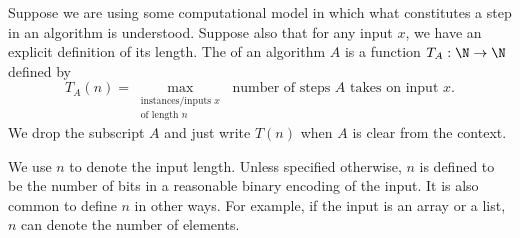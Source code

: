 \begin{definition}
\label{definition:Worst-case-running-time-of-an-algorithm}
Suppose we are using some computational model in which what constitutes a step in an algorithm is understood. Suppose also that for any input $x$, we have an explicit definition of its length. The  of an algorithm $A$ is a function $T_A : \N \to \N$ defined by
\[
T_A(n) = \max_{\substack{\text{instances/inputs $x$} \\ \text{of length $n$}}} \text{ number of steps $A$ takes on input $x$}.
\]
We drop the subscript $A$ and just write $T(n)$ when $A$ is clear from the context.

\end{definition}

\begin{important}
\label{important:Input-length}
We use $n$ to denote the input length. Unless specified otherwise, $n$ is defined to be the number of bits in a reasonable binary encoding of the input. It is also common to define $n$ in other ways. For example, if the input is an array or a list, $n$ can denote the number of elements.

\end{important}

